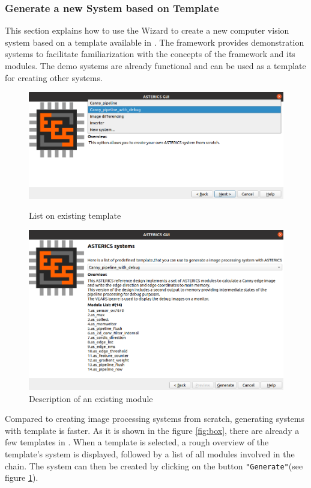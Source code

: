 	\subsubsection{Generate a new System based on Template}\label{subsub:06-05-new-system-based-on-template}
	This section explains how to use the Wizard to create a new computer vision system based on a template available in \asterics. The \asterics framework provides demonstration systems to facilitate familiarization with the concepts of the framework and its modules. The demo systems are already functional and can be used as a template for creating other systems.
	\begin{figure}[!ht]
		\centering
		\begin{minipage}{0.47\textwidth}
			\centering
			\includegraphics[width=\textwidth]{figs/gui/box}
			\caption{List on existing template}
			\label{fig:box}
		\end{minipage} 
		\hfill
		\begin{minipage}{0.47\textwidth}
			\centering
			\includegraphics[width=\textwidth,]{figs/gui/exist}
			\caption{Description of an existing module}
			\label{fig:exist}
		\end{minipage}
	\end{figure}
	Compared to creating image processing systems from scratch, generating systems with template is faster. As it is shown in the figure \ref{fig:box}, there are already a few templates in \asterics. When a template is selected, a rough overview of the template's system is displayed, followed by a list of all modules involved in the chain. The system can then be created by clicking on the button \texttt{"Generate"}(see figure \ref{fig:exist}).
	
